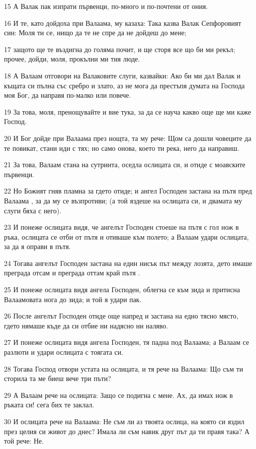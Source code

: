 \par 15 А Валак пак изпрати първенци, по-много и по-почтени от ония.
\par 16 И те, като дойдоха при Валаама, му казаха: Така казва Валак Сепфоровият син: Моля ти се, нищо да те не спре да не дойдеш до мене;
\par 17 защото ще те въздигна до голяма почит, и ще сторя все що би ми рекъл; прочее, дойди, моля, прокълни ми тия люде.
\par 18 А Валаам отговори на Валаковите слуги, казвайки: Ако би ми дал Валак и къщата си пълна със сребро и злато, аз не мога да престъпя думата на Господа моя Бог, да направя по-малко или повече.
\par 19 За това, моля, пренощувайте и вие тука, за да се науча какво още ще ми каже Господ.
\par 20 И Бог дойде при Валаама през нощта, та му рече: Щом са дошли човеците да те повикат, стани иди с тях; но само онова, което ти река, него да направиш.
\par 21 За това, Валаам стана на сутринта, оседла ослицата си, и отиде с моавските първенци.
\par 22 Но Божият гняв пламна за гдето отиде; и ангел Господен застана на пътя пред Валаама , за да му се възпротиви; (а той яздеше на ослицата си, и двамата му слуги бяха с него).
\par 23 И понеже ослицата видя, че ангелът Господен стоеше на пътя с гол нож в ръка, ослицата се отби от пътя и отиваше към полето; а Валаам удари ослицата, за да я оправи в пътя.
\par 24 Тогава ангелът Господен застана на един нисък път между лозята, дето имаше преграда отсам и преграда оттам край пътя .
\par 25 И понеже ослицата видя ангела Господен, облегна се към зида и притисна Валаамовата нога до зида; и той я удари пак.
\par 26 После ангелът Господен отиде още напред и застана на едно тясно място, гдето нямаше къде да си отбие ни надясно ни наляво.
\par 27 И понеже ослицата видя ангела Господен, тя падна под Валаама; а Валаам се разлюти и удари ослицата с тоягата си.
\par 28 Тогава Господ отвори устата на ослицата, и тя рече на Валаама: Що съм ти сторила та ме биеш вече три пъти?
\par 29 А Валаам рече на ослицата: Защо се подигна с мене. Ах, да имах нож в ръката си! сега бих те заклал.
\par 30 И ослицата рече на Валаама: Не съм ли аз твоята ослица, на която си яздил през целия си живот до днес? Имала ли съм навик друг път да ти правя така? А той рече: Не.
